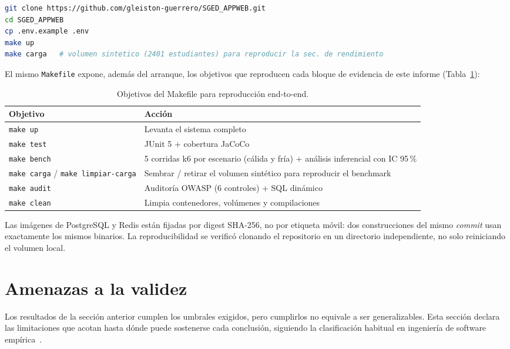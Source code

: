 \documentclass[11pt,a4paper]{article}
\begin{document}
\begin{lstlisting}[language=bash,caption={Arranque reproducible},label={lst:arranque-reproducible}]
git clone https://github.com/gleiston-guerrero/SGED_APPWEB.git
cd SGED_APPWEB
cp .env.example .env
make up
make carga   # volumen sintetico (2401 estudiantes) para reproducir la sec. de rendimiento
\end{lstlisting}

El mismo \texttt{Makefile} expone, además del arranque, los objetivos
que reproducen cada bloque de evidencia de este informe
(Tabla~\ref{tab:makefile-objetivos}):

\begin{table}[htbp]
\centering
\caption{Objetivos del Makefile para reproducción end-to-end.}
\label{tab:makefile-objetivos}
\begin{tabular}{@{}ll@{}}
\toprule
\textbf{Objetivo} & \textbf{Acción} \\
\midrule
\texttt{make up} & Levanta el sistema completo \\
\texttt{make test} & JUnit 5 + cobertura JaCoCo \\
\texttt{make bench} & 5 corridas k6 por escenario (cálida y fría) + análisis inferencial con IC 95\,\% \\
\texttt{make carga} / \texttt{make limpiar-carga} & Sembrar / retirar el volumen sintético para reproducir el benchmark \\
\texttt{make audit} & Auditoría OWASP (6 controles) + SQL dinámico \\
\texttt{make clean} & Limpia contenedores, volúmenes y compilaciones \\
\bottomrule
\end{tabular}
\end{table}

Las imágenes de PostgreSQL y Redis están fijadas por digest SHA-256, no por
etiqueta móvil: dos construcciones del mismo \emph{commit} usan exactamente
los mismos binarios. La reproducibilidad se verificó clonando el repositorio
en un directorio independiente, no solo reiniciando el volumen local.

\section{Amenazas a la validez}
\label{sec:amenazas}

Los resultados de la sección anterior cumplen los umbrales exigidos, pero
cumplirlos no equivale a ser generalizables. Esta sección declara las
limitaciones que acotan hasta dónde puede sostenerse cada conclusión,
siguiendo la clasificación habitual en ingeniería de software
empírica~\cite{iso25010}.
\end{document}
